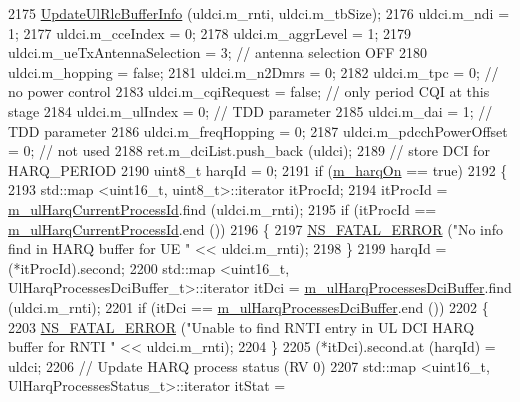 \begin{DoxyCode}
2175       \hyperlink{classns3_1_1CqaFfMacScheduler_a6a8ace20f79d661b0c8fc97dae918298}{UpdateUlRlcBufferInfo} (uldci.m\_rnti, uldci.m\_tbSize);
2176       uldci.m\_ndi = 1;
2177       uldci.m\_cceIndex = 0;
2178       uldci.m\_aggrLevel = 1;
2179       uldci.m\_ueTxAntennaSelection = 3; \textcolor{comment}{// antenna selection OFF}
2180       uldci.m\_hopping = \textcolor{keyword}{false};
2181       uldci.m\_n2Dmrs = 0;
2182       uldci.m\_tpc = 0; \textcolor{comment}{// no power control}
2183       uldci.m\_cqiRequest = \textcolor{keyword}{false}; \textcolor{comment}{// only period CQI at this stage}
2184       uldci.m\_ulIndex = 0; \textcolor{comment}{// TDD parameter}
2185       uldci.m\_dai = 1; \textcolor{comment}{// TDD parameter}
2186       uldci.m\_freqHopping = 0;
2187       uldci.m\_pdcchPowerOffset = 0; \textcolor{comment}{// not used}
2188       ret.m\_dciList.push\_back (uldci);
2189       \textcolor{comment}{// store DCI for HARQ\_PERIOD}
2190       uint8\_t harqId = 0;
2191       \textcolor{keywordflow}{if} (\hyperlink{classns3_1_1CqaFfMacScheduler_afcb424ab57ad0d96293a7970c0b55dcf}{m\_harqOn} == \textcolor{keyword}{true})
2192         \{
2193           std::map <uint16\_t, uint8\_t>::iterator itProcId;
2194           itProcId = \hyperlink{classns3_1_1CqaFfMacScheduler_a55974c35f8b783bb902ae8676fb6ff10}{m\_ulHarqCurrentProcessId}.find (uldci.m\_rnti);
2195           \textcolor{keywordflow}{if} (itProcId == \hyperlink{classns3_1_1CqaFfMacScheduler_a55974c35f8b783bb902ae8676fb6ff10}{m\_ulHarqCurrentProcessId}.end ())
2196             \{
2197               \hyperlink{group__fatal_ga5131d5e3f75d7d4cbfd706ac456fdc85}{NS\_FATAL\_ERROR} (\textcolor{stringliteral}{"No info find in HARQ buffer for UE "} << uldci.m\_rnti);
2198             \}
2199           harqId = (*itProcId).second;
2200           std::map <uint16\_t, UlHarqProcessesDciBuffer\_t>::iterator itDci = 
      \hyperlink{classns3_1_1CqaFfMacScheduler_a9af9c203c1b5fc43336988caf2294562}{m\_ulHarqProcessesDciBuffer}.find (uldci.m\_rnti);
2201           \textcolor{keywordflow}{if} (itDci == \hyperlink{classns3_1_1CqaFfMacScheduler_a9af9c203c1b5fc43336988caf2294562}{m\_ulHarqProcessesDciBuffer}.end ())
2202             \{
2203               \hyperlink{group__fatal_ga5131d5e3f75d7d4cbfd706ac456fdc85}{NS\_FATAL\_ERROR} (\textcolor{stringliteral}{"Unable to find RNTI entry in UL DCI HARQ buffer for RNTI "} << 
      uldci.m\_rnti);
2204             \}
2205           (*itDci).second.at (harqId) = uldci;
2206           \textcolor{comment}{// Update HARQ process status (RV 0)}
2207           std::map <uint16\_t, UlHarqProcessesStatus\_t>::iterator itStat = 

\end{DoxyCode}

